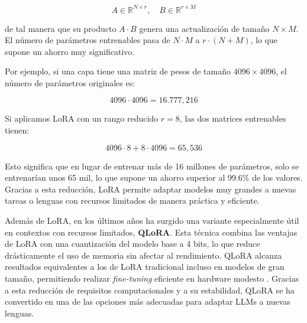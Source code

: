 \[
A \in \mathbb{R}^{N \times r}, \quad B \in \mathbb{R}^{r \times M}
\]



de tal manera que su producto \(A \cdot B\) genera una actualización de tamaño \(N \times M\). El número de parámetros entrenables pasa de \(N \cdot M\) a \(r \cdot (N + M)\), lo que supone un ahorro muy significativo.

Por ejemplo, si una capa tiene una matriz de pesos de tamaño \(4096 \times 4096\), el número de parámetros originales es:



\[
4096 \cdot 4096 = 16{.}777{,}216
\]



Si aplicamos LoRA con un rango reducido \(r = 8\), las dos matrices entrenables tienen:



\[
4096 \cdot 8 + 8 \cdot 4096 = 65{,}536
\]



Esto significa que en lugar de entrenar más de 16 millones de parámetros, solo se entrenarían unos 65 mil, lo que supone un ahorro superior al 99.6\% de los valores. Gracias a esta reducción, LoRA permite adaptar modelos muy grandes a nuevas tareas o lenguas con recursos limitados de manera práctica y eficiente.

Además de LoRA, en los últimos años ha surgido una variante especialmente útil en contextos con recursos limitados, \textbf{QLoRA}. Esta técnica combina las ventajas de LoRA con una cuantización del modelo base a 4 bits, lo que reduce drásticamente el uso de memoria sin afectar al rendimiento. QLoRA alcanza resultados equivalentes a los de LoRA tradicional incluso en modelos de gran tamaño, permitiendo realizar \textit{fine-tuning} eficiente en hardware modesto \cite{dettmers2023qlora}. Gracias a esta reducción de requisitos computacionales y a su estabilidad, QLoRA se ha convertido en una de las opciones más adecuadas para adaptar LLMs a nuevas lenguas.

